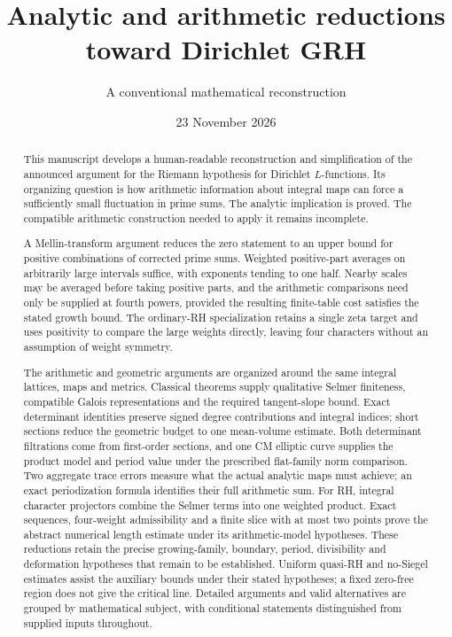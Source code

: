 
\title{Analytic and arithmetic reductions\\toward Dirichlet GRH}
\author{A conventional mathematical reconstruction}
\date{23 November 2026}

\maketitle
\begin{abstract}
This manuscript develops a human-readable reconstruction and simplification
of the announced argument for the Riemann hypothesis for Dirichlet
$L$-functions. Its organizing question is how arithmetic information about
integral maps can force a sufficiently small fluctuation in prime sums.
The analytic implication is proved. The compatible arithmetic construction
needed to apply it remains incomplete.

A Mellin-transform argument reduces the zero statement to an upper bound
for positive combinations of corrected prime sums. Weighted positive-part
averages on arbitrarily large intervals suffice, with exponents tending to
one half. Nearby scales may be averaged before taking positive parts, and
the arithmetic comparisons need only be supplied at fourth powers, provided
the resulting finite-table cost satisfies the stated growth bound.
The ordinary-RH specialization retains a single zeta target and uses
positivity to compare the large weights directly, leaving four characters
without an assumption of weight symmetry.

The arithmetic and geometric arguments are organized around the same
integral lattices, maps and metrics. Classical theorems supply qualitative
Selmer finiteness, compatible Galois representations and the required
tangent-slope bound. Exact determinant identities preserve signed degree
contributions and integral indices; short sections reduce the geometric
budget to one mean-volume estimate. Both determinant filtrations come
from first-order sections, and one CM elliptic curve supplies the product
model and period value under the prescribed flat-family norm comparison.
Two aggregate trace errors measure what the actual analytic maps must
achieve; an exact periodization formula identifies their full arithmetic
sum. For RH, integral character projectors combine the Selmer terms into
one weighted product. Exact sequences, four-weight admissibility and a
finite slice with at most two points prove the abstract numerical length
estimate under its arithmetic-model hypotheses.
These reductions retain the precise growing-family, boundary, period,
divisibility and deformation hypotheses that remain to be established.
Uniform quasi-RH and no-Siegel estimates assist the auxiliary bounds under
their stated hypotheses; a fixed zero-free region does not give the
critical line. Detailed arguments and valid alternatives are grouped by
mathematical subject, with conditional statements distinguished from
supplied inputs throughout.
\end{abstract}
\clearpage
\setcounter{tocdepth}{1}
\hypersetup{bookmarksdepth=2}
\begingroup\small\setlength{\parskip}{0pt}
\tableofcontents
\endgroup
\clearpage

